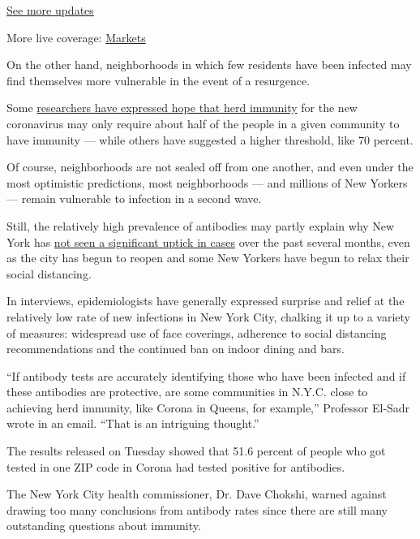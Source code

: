 \href{https://www.nytimes3xbfgragh.onion/2020/08/20/world/coronavirus-covid.html?action=click\&pgtype=Article\&state=default\&region=MAIN_CONTENT_1\&context=storylines_live_updates}{See
more updates}

More live coverage:
\href{https://www.nytimes3xbfgragh.onion/live/2020/08/20/business/stock-market-today-coronavirus?action=click\&pgtype=Article\&state=default\&region=MAIN_CONTENT_1\&context=storylines_live_updates}{Markets}

On the other hand, neighborhoods in which few residents have been
infected may find themselves more vulnerable in the event of a
resurgence.

Some
\href{https://www.nytimes3xbfgragh.onion/2020/08/17/health/coronavirus-herd-immunity.html}{researchers
have expressed hope that herd immunity} for the new coronavirus may only
require about half of the people in a given community to have immunity
--- while others have suggested a higher threshold, like 70 percent.

Of course, neighborhoods are not sealed off from one another, and even
under the most optimistic predictions, most neighborhoods --- and
millions of New Yorkers --- remain vulnerable to infection in a second
wave.

Still, the relatively high prevalence of antibodies may partly explain
why New York has
\href{https://www.nytimes3xbfgragh.onion/2020/08/17/nyregion/coronavirus-second-wave-nyc.html}{not
seen a significant uptick in cases} over the past several months, even
as the city has begun to reopen and some New Yorkers have begun to relax
their social distancing.

In interviews, epidemiologists have generally expressed surprise and
relief at the relatively low rate of new infections in New York City,
chalking it up to a variety of measures: widespread use of face
coverings, adherence to social distancing recommendations and the
continued ban on indoor dining and bars.

``If antibody tests are accurately identifying those who have been
infected and if these antibodies are protective, are some communities in
N.Y.C. close to achieving herd immunity, like Corona in Queens, for
example,'' Professor El-Sadr wrote in an email. ``That is an intriguing
thought.''

The results released on Tuesday showed that 51.6 percent of people who
got tested in one ZIP code in Corona had tested positive for antibodies.

The New York City health commissioner, Dr. Dave Chokshi, warned against
drawing too many conclusions from antibody rates since there are still
many outstanding questions about immunity.

